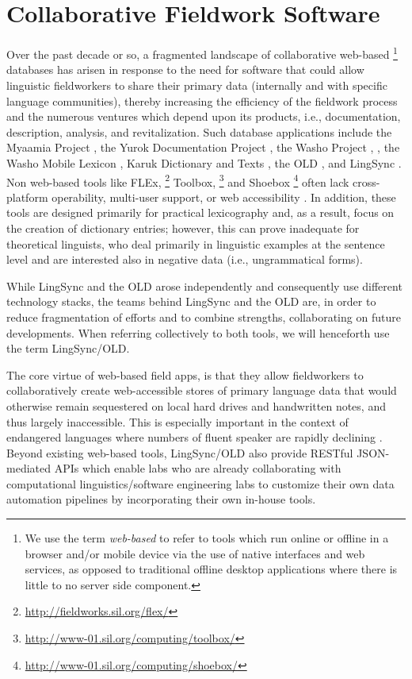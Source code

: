\documentclass[11pt]{article}
\begin{document}
\section{Collaborative Fieldwork Software}
\label{other-software}
Over the past decade or so, a fragmented landscape of collaborative web-based%
\footnote{We use the term \emph{web-based} to refer to tools which run online
or offline in a browser and/or mobile device via the use of native interfaces
and web services, as opposed to traditional offline desktop applications where
there is little to no server side component.} %
databases has arisen in response to the need for software that could allow
linguistic fieldworkers to share their primary data (internally and with
specific language communities), thereby increasing the efficiency of the
fieldwork process and the numerous ventures which depend upon its products,
i.e., documentation, description, analysis, and revitalization. Such database
applications include the Myaamia Project \cite{Myaamia:2001}, the Yurok
Documentation Project \cite{Yurok:2001:Online}, the Washo Project
\cite{Washo:2005:Online}, \cite{Cihlar:2008}, the Washo Mobile Lexicon
\cite{WashoMobile:2008:Online}, Karuk Dictionary and Texts
\cite{Karuk:2009:Online}, the OLD \cite{dunham2014}, and LingSync
\cite{lingsync:2012}. Non web-based tools like FLEx,%
\footnote{\url{http://fieldworks.sil.org/flex/}} %
Toolbox,%
\footnote{\url{http://www-01.sil.org/computing/toolbox/}} %
and Shoebox%
\footnote{\url{http://www-01.sil.org/computing/shoebox/}} %
often lack cross-platform operability, multi-user support, or web accessibility
\cite{Butler:2007}. In addition, these tools are designed primarily for
practical lexicography and, as a result, focus on the creation of dictionary
entries; however, this can prove inadequate for theoretical linguists, who deal
primarily in linguistic examples at the sentence level and are interested also
in negative data (i.e., ungrammatical forms).

While LingSync and the OLD arose independently and consequently use different
technology stacks, the teams behind LingSync and the OLD are, in order to
reduce fragmentation of efforts and to combine strengths, collaborating on
future developments. When referring collectively to both tools, we will
henceforth use the term LingSync/OLD.

The core virtue of web-based field apps, is that they allow fieldworkers to
collaboratively create web-accessible stores of primary language data that
would otherwise remain sequestered on local hard drives and handwritten notes,
and thus largely inaccessible. This is especially important in the context of
endangered languages where numbers of fluent speaker are rapidly declining
\cite{fphlcc10}. Beyond existing web-based tools, LingSync/OLD also
provide RESTful JSON-mediated APIs which enable labs who are already
collaborating with computational linguistics/software engineering labs to
customize their own data automation pipelines by incorporating their own
in-house tools.
\end{document}
